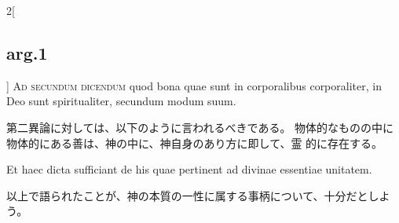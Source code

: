 \documentclass[paper=a4paper,fontsize=10pt,jafontsize=9pt,titlepage]{jlreq}
\begin{document}
\begin{paracol}{2}[\subsection{arg.1}]
{\scshape Ad secundum dicendum} quod bona quae sunt in corporalibus corporaliter,
in Deo sunt spiritualiter, secundum modum suum.

\switchcolumn

第二異論に対しては、以下のように言われるべきである。
物体的なものの中に物体的にある善は、神の中に、神自身のあり方に即して、霊
 的に存在する。

\switchcolumn*

Et haec dicta sufficiant
de his quae pertinent ad divinae essentiae unitatem.

\switchcolumn

以上で語られたことが、神の本質の一性に属する事柄について、十分だとしよう。

\end{paracol}
\end{document}
